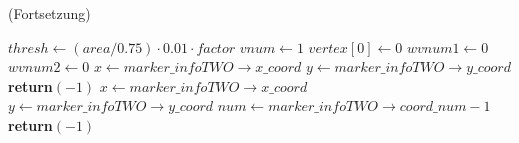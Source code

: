 \begin{algorithm}[ht]
\caption{ (Fortsetzung)}
\label{alg:checksquare-3}
\begin{algorithmic}[1]
	\State $\mathit{thresh} \gets \left(\mathit{area}/0.75\right) \cdot 0.01 \cdot \mathit{factor}$
	\label{alg:checksquare-3-thresh}
	\State $\mathit{vnum} \gets 1$
	\State $\mathit{vertex}[0] \gets 0$
	\State $\mathit{wvnum1} \gets 0$
	\label{alg:checksquare-3-wvnum1}
	\State $\mathit{wvnum2} \gets 0$
	\label{alg:checksquare-3-wvnum2}
	\State $x \gets \mathit{marker\_infoTWO \to x\_coord}$
	\State $y \gets \mathit{marker\_infoTWO \to y\_coord}$
	\label{alg:checksquare-3-getvertex1}
		\State \textbf{return}$(-1)$
	\EndIf
	\State $x \gets \mathit{marker\_infoTWO \to x\_coord}$
	\State $y \gets \mathit{marker\_infoTWO \to y\_coord}$
	\State $\mathit{num} \gets \mathit{marker\_infoTWO \to coord\_num} - 1$
	\label{alg:checksquare-3-getvertex2}
		\State \textbf{return}$(-1)$
	\EndIf
\end{algorithmic}
\end{algorithm}
